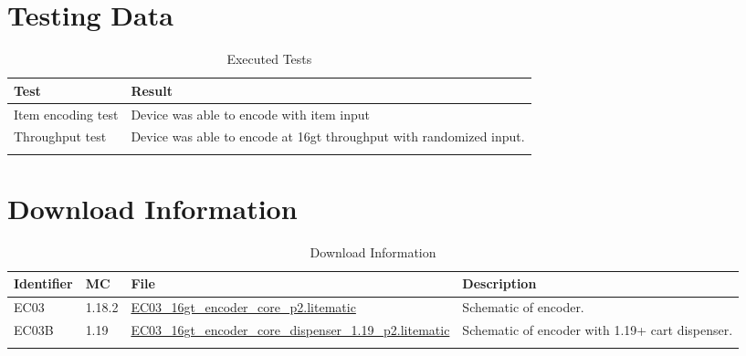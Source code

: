 \documentclass[10pt]{datasheet}
\begin{document}
\section{Testing Data}
\begin{table}[h]
\caption{Executed Tests}
\begin{tabularx}{\textwidth}{l | X}
    \thickhline
    \textbf{Test} & \textbf{Result} \\
    \hline
    Item encoding test & Device was able to encode with item input \\
    \hline
    Throughput test & Device was able to encode at 16gt throughput with randomized input. \\
    \thickhline
\end{tabularx}
\end{table}

\section{Download Information}
\begin{table}[h]
    \caption{Download Information}
    \begin{tabularx}{\textwidth}{l | l | l | X}
        \thickhline
        \textbf{Identifier} & \textbf{MC} & \textbf{File} & \textbf{Description} \\
        \hline
        EC03 & 1.18.2 & \href{https://github.com/Soontech-Annals/Archive/blob/92d3541e07ddc3ab90360e923907f040eca76834/Archive/encoders/EC03\%2016gt\%20Item\%20Encoder/EC03\_16gt\_encoder\_core\_p2.litematic?raw=1}{EC03\_16gt\_encoder\_core\_p2.litematic} & Schematic of encoder. \\
        \hline
        EC03B & 1.19 & \href{https://github.com/Soontech-Annals/Archive/blob/92d3541e07ddc3ab90360e923907f040eca76834/Archive/encoders/EC03\%2016gt\%20Item\%20Encoder/EC03\_16gt\_encoder\_core\_dispenser\_1.19\_p2.litematic?raw=1}{EC03\_16gt\_encoder\_core\_dispenser\_1.19\_p2.litematic} & Schematic of encoder with 1.19+ cart dispenser. \\
        \thickhline
    \end{tabularx}
\end{table}
\end{document}

